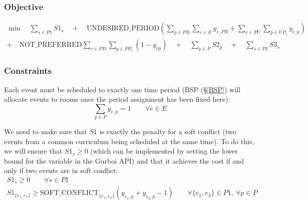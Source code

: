 \documentclass{article}
\theoremstyle{plain}
\numberwithin{theorem}{section}
\numberwithin{example}{section}
\theoremstyle{definition}
\begin{document}
\subsubsection*{Objective}
\begin{multline*}
    \min \quad \sum_{s \in P1} S1_s \quad + \quad \text{UNDESIRED\_PERIOD}
        \left( \sum_{p \in PB} \sum_{e \in E} y_{e, PB} +
        \sum_{e \in PU} \sum_{p \in UP_e} y_{e, p} \right) \\
    + \quad \text{NOT\_PREFERRED} \sum_{e \in PD} \sum_{p \in PP_e} (1 - y_{ep})
        \quad + \quad \sum_{p \in P} S2_p \quad + \quad \sum_{s \in P3} S3_s
\end{multline*}

\subsubsection*{Constraints}
Each event must be scheduled to exactly one time period (BSP (\S\ref{BSP}) will
allocate events to rooms once the period assignment has been fixed here):
\begin{equation}
    \sum_{p \in P} y_{e,p} = 1 \qquad \forall e \in E
\end{equation}

We need to make sure that $S1$ is exactly the penalty for a soft conflict (two
events from a common curriculum being scheduled at the same time). To do this,
we will ensure that $S1_s \geq 0$ (which can be implemented by setting the lower
bound for the variable in the Gurboi API) and that it achieves the cost if and
only if two events are in soft conflict:
\begin{gather}
    S1_s \geq 0 \qquad \forall s \in P1 \\
    S1_{\{e_1, e_2\}} \geq \text{SOFT\_CONFLICT}_{\{e_1, e_2\}}
        (y_{e_1, p} + y_{e_2, p} - 1)
        \qquad \forall \{e_1, e_2\} \in P1, \ \forall p \in P
\end{gather}
\end{document}
